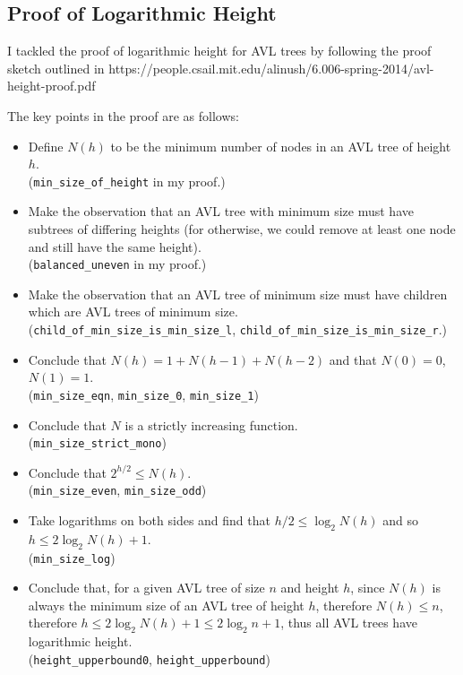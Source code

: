 \documentclass[acmsmall, authorversion, nonacm, overload]{acmart}
\begin{document}
\newpage
\subsection{Proof of Logarithmic Height}

I tackled the proof of logarithmic height
for AVL trees by following the proof sketch outlined in
https://people.csail.mit.edu/alinush/6.006-spring-2014/avl-height-proof.pdf

The key points in the proof are as follows:
\begin{itemize}
\item Define $N(h)$ to be the minimum number of nodes in an AVL tree of height $h$.\\
  (\verb|min_size_of_height| in my proof.)
\item Make the observation that
  an AVL tree with minimum size must have subtrees of differing heights
  (for otherwise, we could remove at least one node and still have the same height).\\
  (\verb|balanced_uneven| in my proof.)
\item Make the observation that an AVL tree of minimum size
  must have children which are AVL trees of minimum size.\\
  (\verb|child_of_min_size_is_min_size_l|, \verb|child_of_min_size_is_min_size_r|.)
\item Conclude that $N(h) = 1 + N(h - 1) + N(h - 2)$
  and that $N(0) = 0$, $N(1) = 1$.\\
  (\verb|min_size_eqn|, \verb|min_size_0|, \verb|min_size_1|)
\item Conclude that $N$ is a strictly increasing function.\\
  (\verb|min_size_strict_mono|)
\item Conclude that $2^{h/2} \le N(h)$.\\
  (\verb|min_size_even|, \verb|min_size_odd|)
\item Take logarithms on both sides and find that $h/2 \le \log_2 N(h)$
  and so $h \le 2\log_2 N(h) + 1$.\\
  (\verb|min_size_log|)
\item Conclude that,
  for a given AVL tree of size $n$ and height $h$,
  since $N(h)$ is always the minimum size of an AVL tree of height $h$,
  therefore $N(h) \le n$, therefore
  $h \le 2\log_2 N(h) + 1 \le 2\log_2 n + 1$,
  thus all AVL trees have logarithmic height.\\
  (\verb|height_upperbound0|, \verb|height_upperbound|)
\end{itemize}
\end{document}
